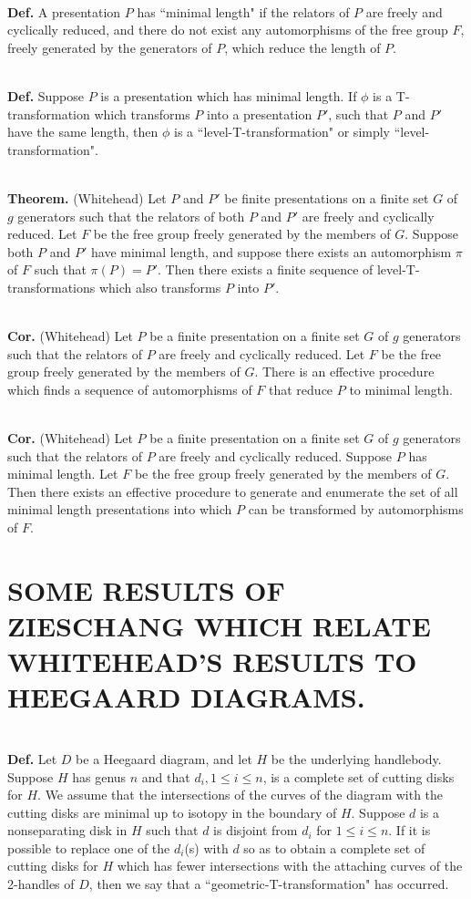 \documentclass[12pt]{amsart}
\newcommand{\definition}{\ \\ \noindent \textbf{Def.} }
\newcommand{\theorem}{\ \\ \noindent  \textbf{Theorem.} }
\newcommand{\corollary}{\ \\ \noindent \textbf{Cor.} }
\begin{document}
\definition     A presentation $P$ has ``minimal length" if the relators of $P$ are freely and cyclically
        reduced, and there do not exist any automorphisms of the free group $F$, freely generated
        by the generators of $P$, which reduce the length of $P$.

\definition     Suppose $P$ is a presentation which has minimal length. If $\phi$ is a T-transformation
        which transforms $P$ into a presentation $P'$, such that $P$ and $P'$ have the same length,
        then $\phi$ is a ``level-T-transformation" or simply   ``level-transformation".
                
\theorem (Whitehead) Let $P$ and $P'$ be finite presentations on a finite set $G$ of $g$ generators
        such that the relators of both $P$ and $P'$ are freely and cyclically reduced. Let $F$ be the
        free group freely generated by the members of $G$. Suppose both $P$ and $P'$ have minimal
        length, and suppose there exists an automorphism $\pi$  of $F$ such that $\pi(P) = P'$. Then there
        exists a finite sequence of level-T-transformations which also transforms $P$ into $P'$.
        
\corollary      (Whitehead) Let $P$ be a finite presentation on a finite set $G$ of $g$ generators such
        that the relators of $P$ are freely and cyclically reduced. Let $F$ be the free group freely
        generated by the members of $G$. There is an effective procedure which finds a sequence of
        automorphisms of $F$ that reduce $P$ to minimal length.
        
\corollary      (Whitehead) Let $P$ be a finite presentation on a finite set $G$ of $g$ generators such
        that the relators of $P$ are freely and cyclically reduced. Suppose $P$ has minimal length.
        Let $F$ be the free group freely generated by the members of $G$. Then there exists an
        effective procedure to generate and enumerate the set of all minimal length
        presentations into which $P$ can be transformed by automorphisms of $F$.        
        

\section{SOME RESULTS OF ZIESCHANG WHICH RELATE WHITEHEAD'S RESULTS TO HEEGAARD DIAGRAMS.}

        
\definition     Let $D$ be a Heegaard diagram, and let $H$ be the underlying handlebody. Suppose $H$ has
        genus $n$ and that $d_i, 1 \leq i \leq n$, is a complete set of cutting disks for $H$. We assume
        that the intersections of the curves of the diagram with the cutting disks are minimal
        up to isotopy in the boundary of $H$. Suppose $d$ is a nonseparating disk in $H$ such that
        $d$ is disjoint from $d_i$ for $1 \leq i \leq n$. If it is possible to replace one of the $d_i$(s)
        with $d$ so as to obtain a complete set of cutting disks for $H$ which has fewer
        intersections with the attaching curves of the 2-handles of $D$, then we say that a
         ``geometric-T-transformation" has occurred.
\end{document}
